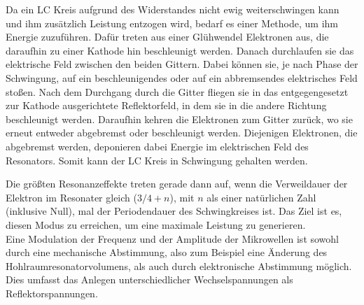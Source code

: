 Da ein LC Kreis aufgrund des Widerstandes nicht ewig weiterschwingen kann und ihm
zusätzlich Leistung entzogen wird, bedarf es einer Methode, um ihm Energie zuzuführen.
Dafür treten aus einer Glühwendel Elektronen aus, die daraufhin zu einer Kathode hin
beschleunigt werden. Danach durchlaufen sie das elektrische Feld zwischen den beiden
Gittern. Dabei können sie, je nach Phase der Schwingung, auf ein beschleunigendes
oder auf ein abbremsendes elektrisches Feld stoßen. Nach dem Durchgang durch die Gitter fliegen sie in das entgegengesetzt
zur Kathode ausgerichtete Reflektorfeld, in dem sie in die andere Richtung beschleunigt
werden. Daraufhin kehren die Elektronen zum Gitter zurück, wo sie erneut entweder
abgebremst oder beschleunigt werden. Diejenigen Elektronen, die abgebremst werden,
deponieren dabei Energie im elektrischen Feld des Resonators. Somit kann der LC Kreis
in Schwingung gehalten werden.

Die größten Resonanzeffekte treten gerade dann auf, wenn die Verweildauer der Elektron im Resonater
gleich ($3/4 + n$), mit $n$ als einer natürlichen Zahl (inklusive Null), mal der Periodendauer des Schwingkreises ist. Das Ziel ist es, diesen Modus zu erreichen, um
eine maximale Leistung zu generieren.\\
Eine Modulation der Frequenz und der Amplitude der Mikrowellen ist sowohl durch eine mechanische Abstimmung, also zum Beispiel eine Änderung des Hohlraumresonatorvolumens, als auch durch elektronische Abstimmung möglich. Dies umfasst das Anlegen unterschiedlicher Wechselspannungen als Reflektorspannungen.
